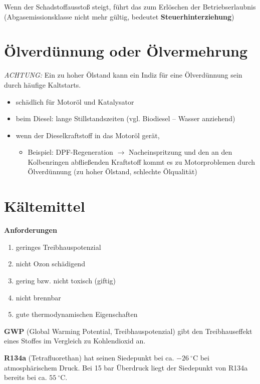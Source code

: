 Wenn der Schadstoffausstoß steigt, führt das zum Erlöschen der
Betriebserlaubnis (Abgasemissionsklasse nicht mehr gültig, bedeutet
\textbf{Steuerhinterziehung})

\section{Ölverdünnung oder
Ölvermehrung}\label{oelverduennung-oder-oelvermehrung}

\emph{ACHTUNG:} Ein zu hoher Ölstand kann ein Indiz für eine
Ölverdünnung sein durch häufige Kaltstarts.

\begin{itemize}
\item
  schädlich für Motoröl und Katalysator
\item
  beim Diesel: lange Stillstandszeiten (vgl. Biodiesel -- Wasser
  anziehend)
\item
  wenn der Dieselkraftstoff in das Motoröl gerät,

  \begin{itemize}
  \item
    Beispiel: DPF-Regeneration $\to$ Nacheinspritzung und den an den
    Kolbenringen abfließenden Kraftstoff kommt es zu Motorproblemen
    durch Ölverdünnung (zu hoher Ölstand, schlechte Ölqualität)
  \end{itemize}
\end{itemize}

\section{Kältemittel}\label{kaeltemittel}

\textbf{Anforderungen}

\begin{enumerate}
\item
  geringes Treibhauspotenzial
\item
  nicht Ozon schädigend
\item
  gering bzw. nicht toxisch (giftig)
\item
  nicht brennbar
\item
  gute thermodynamischen Eigenschaften
\end{enumerate}

\textbf{GWP} (Global Warming Potential, Treibhauspotenzial) gibt den
Treibhauseffekt eines Stoffes im Vergleich zu Kohlendioxid an.

\textbf{R134a} (Tetrafluorethan) hat seinen Siedepunkt bei ca.
$-26~^\circ\text{C}$ bei atmosphärischem Druck. Bei 15 bar Überdruck
liegt der Siedepunkt von R134a bereits bei ca. $55~^\circ\text{C}$.


